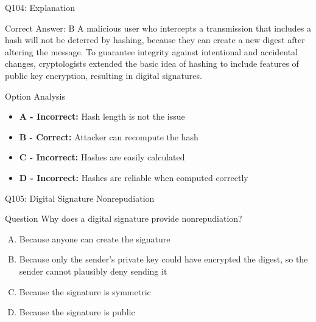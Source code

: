 \documentclass{beamer}
\begin{document}
	\begin{frame}{Q104: Explanation}
		\begin{block}{Correct Answer: B}
			A malicious user who intercepts a transmission that includes a hash will not be deterred by hashing, because they can create a new digest after altering the message. To guarantee integrity against intentional and accidental changes, cryptologists extended the basic idea of hashing to include features of public key encryption, resulting in digital signatures.
		\end{block}
		\begin{block}{Option Analysis}
			\begin{itemize}
				\item \textbf{A - Incorrect:} Hash length is not the issue
				\item \textbf{B - Correct:} Attacker can recompute the hash
				\item \textbf{C - Incorrect:} Hashes are easily calculated
				\item \textbf{D - Incorrect:} Hashes are reliable when computed correctly
			\end{itemize}
		\end{block}
	\end{frame}
	
	\begin{frame}{Q105: Digital Signature Nonrepudiation}
		\begin{block}{Question}
			Why does a digital signature provide nonrepudiation?
		\end{block}
		\begin{enumerate}[(A)]
			\item Because anyone can create the signature
			\item Because only the sender's private key could have encrypted the digest, so the sender cannot plausibly deny sending it
			\item Because the signature is symmetric
			\item Because the signature is public
		\end{enumerate}
	\end{frame}
	
\end{document}
